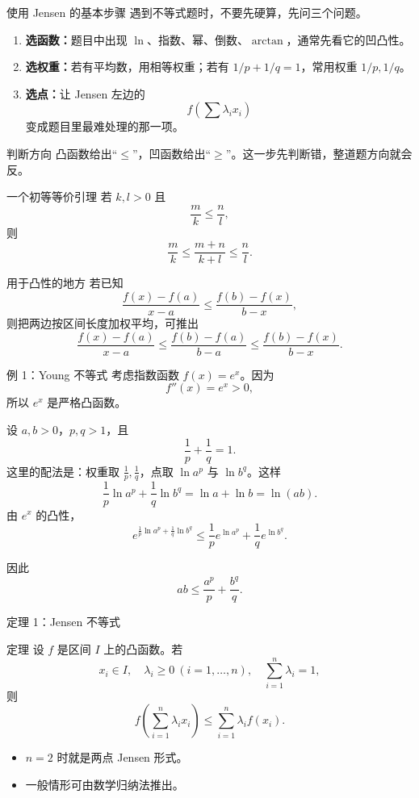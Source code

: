 \documentclass[aspectratio=169,11pt]{ctexbeamer}
\begin{document}
\begin{frame}{使用 Jensen 的基本步骤}
\small
遇到不等式题时，不要先硬算，先问三个问题。

\begin{enumerate}
  \item \textbf{选函数：}题目中出现 $\ln$、指数、幂、倒数、$\arctan$，通常先看它的凹凸性。
  \item \textbf{选权重：}若有平均数，用相等权重；若有 $1/p+1/q=1$，常用权重 $1/p,1/q$。
  \item \textbf{选点：}让 Jensen 左边的
  \[
    f\!\left(\sum \lambda_i x_i\right)
  \]
  变成题目里最难处理的那一项。
\end{enumerate}

\begin{block}{判断方向}
凸函数给出“$\le$”，凹函数给出“$\ge$”。这一步先判断错，整道题方向就会反。
\end{block}
\end{frame}

\begin{frame}{一个初等等价引理}
\small
若 $k,l>0$ 且
\[
  \frac{m}{k}\le \frac{n}{l},
\]
则
\[
  \frac{m}{k}\le \frac{m+n}{k+l}\le \frac{n}{l}.
\]

\begin{block}{用于凸性的地方}
若已知
\[
  \frac{f(x)-f(a)}{x-a}
  \le
  \frac{f(b)-f(x)}{b-x},
\]
则把两边按区间长度加权平均，可推出
\[
  \frac{f(x)-f(a)}{x-a}
  \le
  \frac{f(b)-f(a)}{b-a}
  \le
  \frac{f(b)-f(x)}{b-x}.
\]
\end{block}
\end{frame}

\begin{frame}{例 1：Young 不等式}
\small
考虑指数函数 $f(x)=e^x$。因为
\[
  f''(x)=e^x>0,
\]
所以 $e^x$ 是严格凸函数。

设 $a,b>0$，$p,q>1$，且
\[
  \frac1p+\frac1q=1.
\]
这里的配法是：权重取 $\frac1p,\frac1q$，点取 $\ln a^p$ 与 $\ln b^q$。这样
\[
  \frac1p\ln a^p+\frac1q\ln b^q=\ln a+\ln b=\ln(ab).
\]
由 $e^x$ 的凸性，
\[
  e^{\frac1p\ln a^p+\frac1q\ln b^q}
  \le
  \frac1p e^{\ln a^p}+\frac1q e^{\ln b^q}.
\]

因此
\[
  ab\le \frac{a^p}{p}+\frac{b^q}{q}.
\]
\end{frame}

\begin{frame}{定理 1：Jensen 不等式}
\small
\begin{block}{定理}
设 $f$ 是区间 $I$ 上的凸函数。若
\[
  x_i\in I,\quad \lambda_i\ge0\ (i=1,\dots,n),\quad
  \sum_{i=1}^n\lambda_i=1,
\]
则
\[
  f\!\left(\sum_{i=1}^n\lambda_i x_i\right)
  \le
  \sum_{i=1}^n \lambda_i f(x_i).
\]
\end{block}

\begin{itemize}
  \item $n=2$ 时就是两点 Jensen 形式。
  \item 一般情形可由数学归纳法推出。
\end{itemize}
\end{frame}
\end{document}
